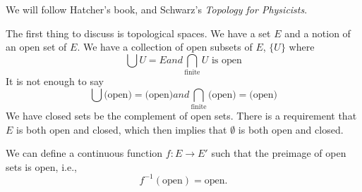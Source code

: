 
We will follow Hatcher's book, and Schwarz's \emph{Topology for Physicists}.

The first thing to discuss is topological
spaces. We have a set
$E$ and a notion of an open set of $E$. We have a collection of
open subsets of $E$, $\{U\}$ where
\begin{subequations}
\begin{equation}
\bigcup U=E
\end{equation}
and
\begin{equation}
\bigcap_{\text{finite}} U\mbox{ is open}
\end{equation}
\end{subequations}
It is not enough to say 
\begin{subequations}
\begin{equation}
\bigcup \mbox{(open)}=\mbox{(open)}
\end{equation}
and
\begin{equation}
\bigcap_{\text{finite}} \mbox{(open)}=\mbox{(open)}
\end{equation}
\end{subequations}
We have closed sets be the complement of open sets. There is a
requirement that $E$ is both open and closed, which then implies
that $\emptyset$ is both open and closed.

We can define a continuous function $f\colon E\to E'$ such that
the preimage of open sets is open, i.e.,
\begin{equation}
f^{-1}(\mbox{open})=\mbox{open}.
\end{equation}

